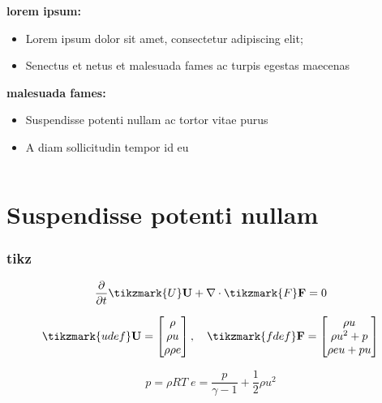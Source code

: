 \begin{frame}
\begin{columns}[c]
\begin{column}{.4\textwidth}
\textbf{lorem ipsum:}
\begin{itemize}
    \item<2-|alert@2>  Lorem ipsum dolor sit amet, consectetur adipiscing elit;
    \item<3-|alert@3>  Senectus et netus et malesuada fames ac turpis egestas maecenas
\end{itemize}
\textbf{malesuada fames:}
\begin{itemize}
    \item<5-|alert@5> Suspendisse potenti nullam ac tortor vitae purus
    \item<6-|alert@6> A diam sollicitudin tempor id eu
\end{itemize}

\end{column}
\end{columns}


\end{frame}

\section{Suspendisse potenti nullam}
\begin{frame}
\frametitle{tikz}
\begin{equation*}
    \frac{\partial}{\partial t} \tikzmark{U} \mathbf{U} + \nabla\cdot\tikzmark{F}\mathbf{F} = 0
\end{equation*}

\vspace{15pt}

\begin{equation*}
    \tikzmark{udef}\mathbf{U} = 
    \begin{bmatrix}
        \rho \\
        \rho u \\
        \rho \rho e
    \end{bmatrix}, \quad
    \tikzmark{fdef} \mathbf{F} = 
    \begin{bmatrix}
        \rho u \\
        \rho u^2 + p \\
        \rho e u + p u
    \end{bmatrix}
\end{equation*}

\begin{equation*}
    p = \rho R T\; e = \frac{p}{\gamma - 1} + \frac{1}{2}\rho u^2
\end{equation*}

    
\end{frame}

